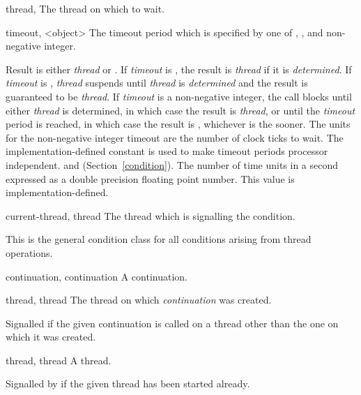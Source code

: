 \begin{optDefinition}
%
\begin{specargs}
%
    \item[thread, \classref{thread}] The thread on which to wait.
%
    \item[timeout, <object>] The timeout period which is specified by one of
    \nil, \true, and non-negative integer.
%
\end{specargs}
%
\result%
Result is either {\em thread} or \nil.  If {\em timeout} is \nil, the result is
{\em thread} if it is {\em determined}.  If {\em timeout} is \true, {\em thread}
suspends until {\em thread} is {\em determined} and the result is guaranteed to
be {\em thread}.  If {\em timeout} is a non-negative integer, the call blocks
until either {\em thread} is determined, in which case the result is {\em
    thread}, or until the {\em timeout} period is reached, in which case the
result is \nil, whichever is the sooner.  The units for the non-negative integer
timeout are the number of clock ticks to wait.  The implementation-defined
constant  is used to make timeout periods
processor independent.
%
\seealso%
 and  (Section~\ref{condition}).
%
%
The number of time units in a second expressed as a double precision floating
point number.  This value is
implementation-defined.

%
\begin{initoptions}
    \item[current-thread, thread] The thread which is signalling the condition.
\end{initoptions}
%
\remarks%
This is the general condition class for all conditions arising from
thread operations.

%
\begin{initoptions}
%
    \item[continuation, continuation] A continuation.
%
    \item[thread, thread] The thread on which {\em continuation} was created.
%
\end{initoptions}
%
\remarks%
Signalled if the given continuation is called on a thread other than
the one on which it was created.

%
\begin{initoptions}
    \item[thread, thread] A thread.
\end{initoptions}
%
\remarks%
Signalled by  if the given thread has been started
already.


\end{optDefinition}
